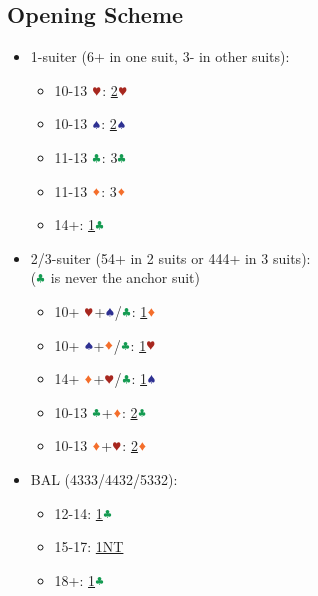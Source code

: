 \documentclass{article}
\begin{document}
\begin{multicols}{2}
\begin{CJK*}{UTF8}{gt}
\section{Opening Scheme}
\begin{itemize}
    \item 1-suiter (6+ in one suit, 3- in other suits):
    \begin{itemize}
        \item 10-13 $\hhh$: \hyperref[sec:1suit]{2$\hhh$}
        \item 10-13 $\sss$: \hyperref[sec:1suit]{2$\sss$}
        \item 11-13 $\ccc$: 3$\ccc$
        \item 11-13 $\ddd$: 3$\ddd$
        \item 14+: \hyperref[sec:1c]{1$\ccc$}
    \end{itemize}
    \item 2/3-suiter (54+ in 2 suits or 444+ in 3 suits):\\
    ($\ccc$ is never the anchor suit)
    \begin{itemize}
        \item 10+ $\hhh$+$\sss$/$\ccc$: \hyperref[sec:1d]{1$\ddd$}
        \item 10+ $\sss$+$\ddd$/$\ccc$: \hyperref[sec:1h]{1$\hhh$}
        \item 14+ $\ddd$+$\hhh$/$\ccc$: \hyperref[sec:1s]{1$\sss$}
        \item 10-13 $\ccc$+$\ddd$: \hyperref[sec:2cd]{2$\ccc$}
        \item 10-13 $\ddd$+$\hhh$: \hyperref[sec:2cd]{2$\ddd$}
    \end{itemize}
    \item BAL (4333/4432/5332):
    \begin{itemize}
        \item 12-14: \hyperref[sec:1c]{1$\ccc$}
        \item 15-17: \hyperref[sec:1n]{1NT}
        \item 18+: \hyperref[sec:1c]{1$\ccc$}
    \end{itemize}
\end{itemize}


\end{CJK*}
\end{multicols}
\end{document}
